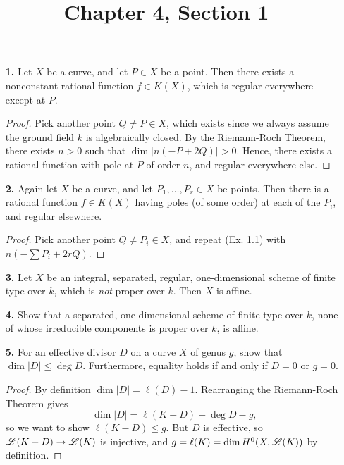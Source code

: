 \documentclass{article}
\title{Chapter 4, Section 1}
\begin{document}
\maketitle
\begin{enumerate} [label=\textbf{\arabic*.}, leftmargin=0em]

\item[\textbf{1.}] Let $X$ be a curve, and let $P \in X$ be a point.
Then there exists a nonconstant  rational function $f \in K(X)$, which is regular everywhere except at $P$.

\begin{proof}
  Pick another point $Q \neq P \in X$, which exists since we always assume the ground field $k$ is algebraically closed.
  By the Riemann-Roch Theorem, there exists $n > 0 $ such that $\dim|n(-P + 2Q)| > 0$.
  Hence, there exists a rational function with pole at $P$ of order $n$, and regular everywhere else.
\end{proof}

\item[\textbf{2.}] Again let $X$ be a curve, and let $P_1, \dots, P_r \in X$ be points.
Then there is a rational function $f \in K(X)$ having poles (of some order) at each of the $P_i$, and regular elsewhere.

\begin{proof}
  Pick another point $Q \neq P_i \in X$, and repeat (Ex. 1.1) with $n(-\sum P_i + 2rQ)$.
\end{proof}

\item[\textbf{3.}] Let $X$ be an integral, separated, regular, one-dimensional scheme of finite type over $k$, which is \textit{not} proper over $k$.
Then $X$ is affine.

\item[\textbf{4.}] Show that a separated, one-dimensional scheme of finite type over $k$, none of whose irreducible components is proper over $k$, is affine.

\item[\textbf{5.}] For an effective divisor $D$ on a curve $X$ of genus $g$, show that $\dim{|D|} \leq \deg{D}$.
Furthermore, equality holds if and only if $D = 0$ or $g = 0$.

\begin{proof}
  By definition $\dim|D| = \ell(D) - 1$. Rearranging the Riemann-Roch Theorem gives
  \begin{equation*}
    \dim{|D|} = \ell(K - D) + \deg{D} - g,
  \end{equation*}
  so we want to show $\ell(K - D) \leq g$. But $D$ is effective, so $\mathscr{L}(K - D) \to \mathscr{L}(K)$ is injective, and $g = \ell(K) = \dim{H^0(X, \mathscr{L}(K))}$ by definition.
\end{proof}


\end{enumerate}
\end{document}
